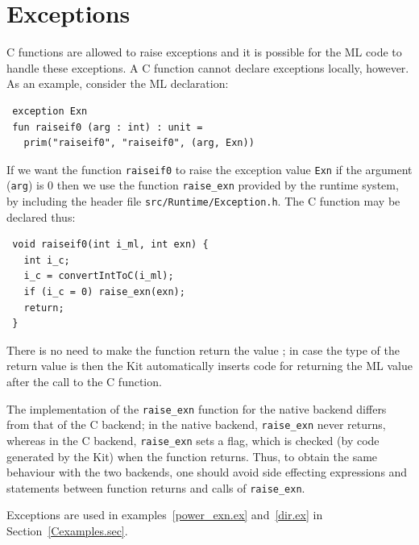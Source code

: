 \documentclass[12pt]{book}
\begin{document}
\section{Exceptions}
\label{C_exceptions.sec}
C functions are allowed to raise exceptions and it is possible for the
ML code to handle these exceptions. A C function cannot declare
exceptions locally, however. As an example, consider the ML
declaration:
\begin{verbatim}
 exception Exn
 fun raiseif0 (arg : int) : unit = 
   prim("raiseif0", "raiseif0", (arg, Exn))
\end{verbatim}
If we want the function \texttt{raiseif0} to raise the exception value
\texttt{Exn} if the argument (\texttt{arg}) is 0 then we use the
function \verb|raise_exn| provided by the runtime system, by
including the header file {\tt src/Runtime/Exception.h}. The C
function  may be declared thus:
\begin{verbatim}
 void raiseif0(int i_ml, int exn) {
   int i_c;
   i_c = convertIntToC(i_ml);
   if (i_c = 0) raise_exn(exn);
   return;
 }
\end{verbatim}
There is no need to make the function return the value ;
in case the type of the return value is  then the Kit
automatically inserts code for returning the ML value \boxml{()} after
the call to the C function.

The implementation of the \verb|raise_exn| function for the native
backend differs from that of the C backend; in the native backend,
\verb|raise_exn| never returns, whereas in the C backend,
\verb|raise_exn| sets a flag, which is checked (by code generated by
the Kit) when the function returns. Thus, to obtain the same behaviour
with the two backends, one should avoid side effecting expressions and
statements between function returns and calls of \verb|raise_exn|.

Exceptions are used in examples~\ref{power_exn.ex} and~\ref{dir.ex} in
Section~\ref{Cexamples.sec}.

\end{document}
